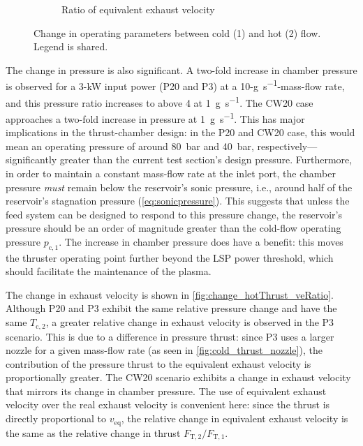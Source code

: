 \begin{figure}[h]
\begin{subfigure}[t]{0.48\textwidth}
                    \caption{Ratio of equivalent exhaust velocity}
                    \label{fig:change_hotThrust_veRatio}
                \end{subfigure}
                \caption[Change in operating parameters between cold (1) and hot (2) flow]{Change in operating parameters between cold (1) and hot (2) flow. Legend is shared.}
                \label{fig:change_hotThrust}
            \end{figure}

            The change in pressure is also significant. A two-fold increase in chamber pressure is observed for a 3-kW input power (P20 and P3) at a 10-\unit{g.s^{-1}}-mass-flow rate, and this pressure ratio increases to above 4 at \qty{1}{g.s^{-1}}. The CW20 case approaches a two-fold increase in pressure at \qty{1}{g.s^{-1}}. This has major implications in the thrust-chamber design: in the P20 and CW20 case, this would mean an operating pressure of around \qty{80}{bar} and \qty{40}{bar}, respectively---significantly greater than the current test section's design pressure. Furthermore, in order to maintain a constant mass-flow rate at the inlet port, the chamber pressure \emph{must} remain below the reservoir's sonic pressure, i.e., around half of the reservoir's stagnation pressure (\autoref{eq:sonicpressure}). This suggests that unless the feed system can be designed to respond to this pressure change, the reservoir's pressure should be an order of magnitude greater than the cold-flow operating pressure $p_\mathrm{c,1}$. The increase in chamber pressure does have a benefit: this moves the thruster operating point further beyond the LSP power threshold, which should facilitate the maintenance of the plasma.

            The change in exhaust velocity is shown in \autoref{fig:change_hotThrust_veRatio}. Although P20 and P3 exhibit the same relative pressure change and have the same $T_\mathrm{c,2}$, a greater relative change in exhaust velocity is observed in the P3 scenario. This is due to a difference in pressure thrust: since P3 uses a larger nozzle for a given mass-flow rate (as seen in \autoref{fig:cold_thrust_nozzle}), the contribution of the pressure thrust to the equivalent exhaust velocity is proportionally greater. The CW20 scenario exhibits a change in exhaust velocity that mirrors its change in chamber pressure. The use of equivalent exhaust velocity over the real exhaust velocity is convenient here: since the thrust is directly proportional to $v_\mathrm{eq}$, the relative change in equivalent exhaust velocity is the same as the relative change in thrust $F_\mathrm{T,2}/F_\mathrm{T,1}$.

